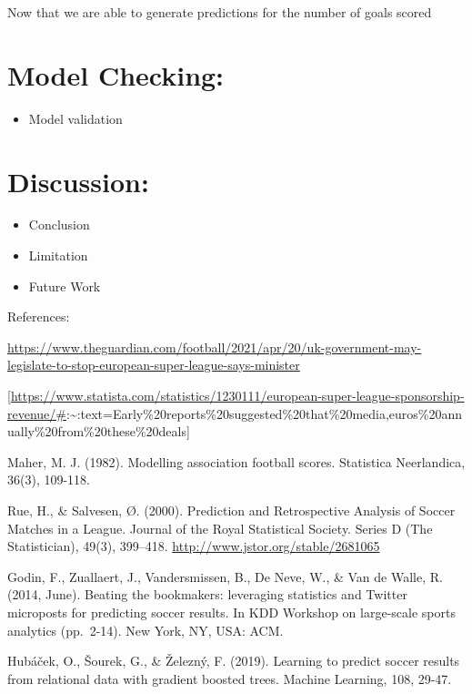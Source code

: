 \documentclass[
]{article}
\providecommand{\tightlist}{%
  \setlength{\itemsep}{0pt}\setlength{\parskip}{0pt}}
\begin{document}
Now that we are able to generate predictions for the number of goals
scored

\hypertarget{model-checking}{%
\section{Model Checking:}\label{model-checking}}

\begin{itemize}
\tightlist
\item
  Model validation
\end{itemize}

\hypertarget{discussion}{%
\section{Discussion:}\label{discussion}}

\begin{itemize}
\tightlist
\item
  Conclusion
\item
  Limitation
\item
  Future Work
\end{itemize}

References:

\url{https://www.theguardian.com/football/2021/apr/20/uk-government-may-legislate-to-stop-european-super-league-says-minister}

{[}\url{https://www.statista.com/statistics/1230111/european-super-league-sponsorship-revenue/\#}:\textasciitilde:text=Early\%20reports\%20suggested\%20that\%20media,euros\%20annually\%20from\%20these\%20deals{]}

Maher, M. J. (1982). Modelling association football scores. Statistica
Neerlandica, 36(3), 109-118.

Rue, H., \& Salvesen, Ø. (2000). Prediction and Retrospective Analysis
of Soccer Matches in a League. Journal of the Royal Statistical Society.
Series D (The Statistician), 49(3), 399--418.
\url{http://www.jstor.org/stable/2681065}

Godin, F., Zuallaert, J., Vandersmissen, B., De Neve, W., \& Van de
Walle, R. (2014, June). Beating the bookmakers: leveraging statistics
and Twitter microposts for predicting soccer results. In KDD Workshop on
large-scale sports analytics (pp.~2-14). New York, NY, USA: ACM.

Hubáček, O., Šourek, G., \& Železný, F. (2019). Learning to predict
soccer results from relational data with gradient boosted trees. Machine
Learning, 108, 29-47.
\end{document}
